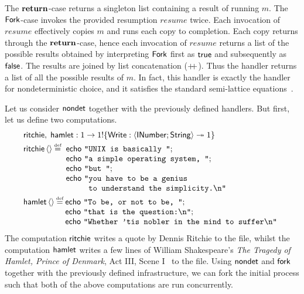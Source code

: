 \documentclass[12pt,phd,lfcs,twoside,openright,logo,leftchapter,normalheadings]{infthesis}
\theoremstyle{plain}
\theoremstyle{definition}
\begin{document}
%
The $\mathbf{return}$-case returns a singleton list containing a result of
running $m$.
%
The $\mathsf{Fork}$-case invokes the provided resumption $resume$ twice. Each
invocation of $resume$ effectively copies $m$ and runs each copy to
completion. Each copy returns through the $\mathbf{return}$-case, hence each
invocation of $resume$ returns a list of the possible results obtained
by interpreting $\mathsf{Fork}$ first as $\mathsf{true}$ and subsequently as
$\mathsf{false}$. The results are joined by list concatenation ($\mathbin{+\!\!+}$).
%
Thus the handler returns a list of all the possible results of $m$.
%
In fact, this handler is exactly the handler for nondeterministic
choice, and it satisfies the standard semi-lattice
equations~\cite{PlotkinP09,PlotkinP13}.

Let us consider $\mathsf{nondet}$ together with the previously defined
handlers. But first, let us define two computations.
%
\[
  \bl
    \quoteRitchie,\;\quoteHamlet : \UnitType \to \UnitType \eff \{\Write: \Record{\UFD;\String} \opto \UnitType\} \smallskip\\
    \quoteRitchie\,\Unit \defas
      \ba[t]{@{~}l}
        \echo~\strlit{UNIX is basically };\\
        \echo~\strlit{a simple operating system, };\\
        \echo~\strlit{but };\\
        \echo~\texttt{"}
          \ba[t]{@{}l}
             \texttt{you have to be a genius }\\
             \texttt{to understand the simplicity.\nl{}"}
          \ea
      \ea \smallskip\\
    \quoteHamlet\,\Unit \defas
      \ba[t]{@{}l}
        \echo~\strlit{To be, or not to be, };\\
        \echo~\strlit{that is the question:\nl};\\
        \echo~\strlit{Whether 'tis nobler in the mind to suffer\nl}
      \ea
  \el
\]
%
The computation $\mathsf{ritchie}$ writes a quote by Dennis Ritchie to
the file, whilst the computation $\mathsf{hamlet}$ writes a few lines of
William Shakespeare's \emph{The Tragedy of Hamlet, Prince of Denmark},
Act III, Scene I~\cite{Shakespeare6416} to the file.
%
Using $\mathsf{nondet}$ and $\mathsf{fork}$ together with the previously defined
infrastructure, we can fork the initial process such that both of the
above computations are run concurrently.
%
\end{document}
